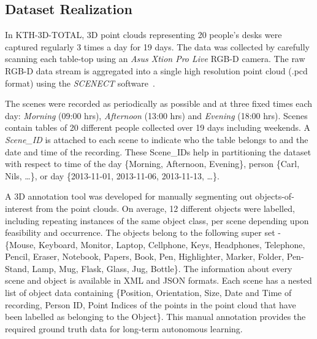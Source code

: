 \documentclass[letterpaper, 10 pt, conference]{ieeeconf}  %
\begin{document}
\subsection{Dataset Realization}
\label{ssec:Dataset Realization}
In KTH-3D-TOTAL, 3D point clouds representing 20 people's desks were captured regularly 3 times a day for 19 days. The data was collected by 
carefully scanning each table-top using an \textit{Asus Xtion Pro Live} RGB-D camera. The raw RGB-D data stream is aggregated into a single 
high resolution point cloud (.pcd format) using the \textit{SCENECT} software~\cite{Buerkler:Online2012}.

The scenes were recorded as periodically as possible and at three fixed times each day: \emph{Morning} (09:00 hrs), \emph{Afternoon} (13:00 
hrs) and \emph{Evening} (18:00 hrs). Scenes contain tables of 20 different people collected over 19 days including weekends. 
A \textit{Scene\_ID} is attached to each scene to indicate who the table belongs to and the date and time of the recording. These Scene\_IDs help in partitioning the dataset with respect to time of the day \{Morning, Afternoon, Evening\}, person \{Carl, Nils, \dots\}, or day \{2013-11-01, 2013-11-06, 2013-11-13, \dots\}.

A 3D annotation tool was developed for manually segmenting out objects-of-interest from the point clouds. On average, 12 different objects 
were labelled, including repeating instances of the same object class, per scene depending upon feasibility and occurrence. The objects 
belong to the following super set - \{Mouse, Keyboard, Monitor, Laptop, Cellphone, Keys, Headphones, Telephone, Pencil, Eraser, Notebook, 
Papers,  Book, Pen, Highlighter, Marker, Folder, Pen-Stand, Lamp, Mug, Flask, Glass, Jug, Bottle\}. The information about every scene and 
object is available in  XML and JSON formats. Each scene has a nested list of object data containing \{Position, Orientation, Size, Date and 
Time of recording, Person ID, Point Indices of the points in the point cloud that have been labelled as belonging to the Object\}. This 
manual annotation provides the required ground truth data for long-term autonomous learning.
\end{document}

